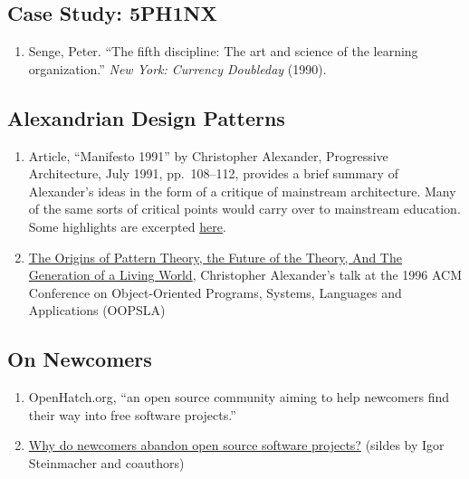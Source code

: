 \hypertarget{case-study-5ph1nx}{%
\subsection{Case Study: 5PH1NX}\label{case-study-5ph1nx}}

\begin{enumerate}
\def\labelenumi{\arabic{enumi}.}
\tightlist
\item
  Senge, Peter. ``The fifth discipline: The art and science of the
  learning organization.'' \emph{New York: Currency Doubleday} (1990).
\end{enumerate}

\hypertarget{alexandrian-design-patterns}{%
\subsection{Alexandrian Design
Patterns}\label{alexandrian-design-patterns}}

\begin{enumerate}
\def\labelenumi{\arabic{enumi}.}
\item
  Article, ``Manifesto 1991'' by Christopher Alexander, Progressive
  Architecture, July 1991, pp.~108--112, provides a brief summary of
  Alexander's ideas in the form of a critique of mainstream
  architecture. Many of the same sorts of critical points would carry
  over to mainstream education. Some highlights are excerpted
  \href{https://plus.google.com/u/0/108598104736826154120/posts/agWYcqPhqSN}{here}.
\item
  \href{http://www.patternlanguage.com/archive/ieee/ieeetext.htm}{The
  Origins of Pattern Theory, the Future of the Theory, And The
  Generation of a Living World}, Christopher Alexander's talk at the
  1996 ACM Conference on Object-Oriented Programs, Systems, Languages
  and Applications (OOPSLA)
\end{enumerate}

\hypertarget{on-newcomers}{%
\subsection{On Newcomers}\label{on-newcomers}}

\begin{enumerate}
\def\labelenumi{\arabic{enumi}.}
\item
  OpenHatch.org, ``an open source community aiming to help newcomers
  find their way into free software projects.''
\item
  \href{http://lapessc.ime.usp.br/public/papers/13872/CHASE13_present.pdf}{Why
  do newcomers abandon open source software projects?} (sildes by Igor
  Steinmacher and coauthors)
\end{enumerate}

